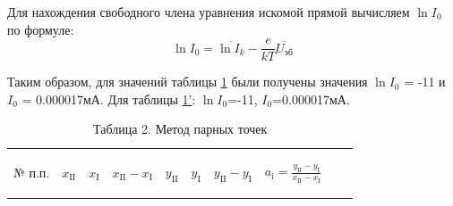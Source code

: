 Для нахождения свободного члена уравнения искомой прямой вычисляем $\ln I_0$ по формуле:
\begin{equation}
    \ln I_0=\overline{\ln I_k}-\frac{e}{kT}\overline{U_{\text{эб}}}
\end{equation}

Таким образом, для значений таблицы \hyperref[tab:1]{1} были получены значения $\ln I_0$ = -11 и $I_0$ = 0.000017мА. Для таблицы \hyperref[tab:1]{1'}: $\ln I_0$=-11, $I_0$=0.000017мА.

\begin{center}
\begin{table}[H]
\centering
\caption*{Таблица 2. Метод парных точек}
\label{tabl:3}
\begin{tabular}{|c|c|c|c|c|c|c|c|c|c|}
\hline
\begin{minipage}{7mm}
    № п.п. 
\end{minipage}&
\begin{minipage}{7mm}
   \begin{center} $x_{\text{II}}$ \end{center} 
\end{minipage} &
\begin{minipage}{7mm}
   \begin{center} $x_{\text{I}}$ \end{center} 
\end{minipage} &
\begin{minipage}{14mm}
   \begin{center} $x_{\text{II}}-x_{\text{I}}$ \end{center} 
\end{minipage}&
\begin{minipage}{7mm}
   \begin{center} $y_{\text{II}}$ \end{center} 
\end{minipage}&
\begin{minipage}{7mm}
   \begin{center} $y_{\text{I}}$ \end{center} 
\end{minipage}&
\begin{minipage}{14mm}
   \begin{center} $y_{\text{II}}-y_{\text{I}}$ \end{center} 
\end{minipage}&
\begin{minipage}{25mm}
   \begin{center} $a_{\text{i}}=\frac{y_{\text{II}}-y_{\text{I}}}{x_{\text{II}}-x_{\text{I}}}$ \end{center} 

\end{minipage}
\end{tabular}
\end{table}
\end{center}
